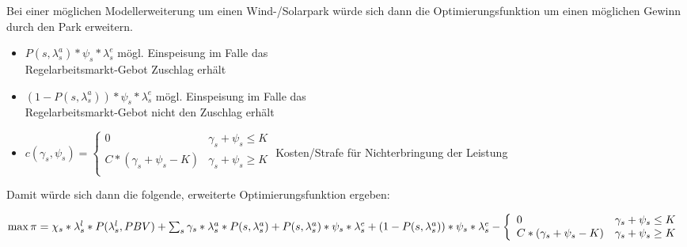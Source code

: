 \documentclass[british,         %
BCOR=2mm,                       %
11pt,                           %
a4paper,						%
oneside,						%
cdgeometry,                     %
toc=chapterentrydotfill,        %
toc=indent,                     %
bibliography=totoc,         	%
listof=totoc,                   %
numbers=noenddot,				%
parskip=full,                   %
cdmath=false					%
]{article}                  %
\begin{document}
Bei einer möglichen Modellerweiterung um einen Wind-/Solarpark würde sich dann die Optimierungsfunktion
um einen möglichen Gewinn durch den Park erweitern.\\


	\begin{itemize}
		\item $ P(s, \lambda_s^a) * \psi_s * \lambda_s^e$ mögl. Einspeisung im Falle das \\Regelarbeitsmarkt-Gebot Zuschlag erhält\\
		\item $ (1 - P(s, \lambda_s^a)) * \psi_s * \lambda_s^e$ mögl. Einspeisung im Falle das \\Regelarbeitsmarkt-Gebot nicht den Zuschlag erhält\\
		\item 	$c(\gamma_s, \psi_s) = \left\{
			\begin{array}{ll}
				0 & \gamma_s + \psi_s \leq K \\
				C * (\gamma_s + \psi_s - K) & \gamma_s + \psi_s \geq K \\
			\end{array}
		\right. $ Kosten/Strafe für Nichterbringung der Leistung\\

	\end{itemize}
	
	


Damit würde sich dann die folgende, erweiterte Optimierungsfunktion ergeben:\\
\begin{addmargin}[25pt]{0pt}
	$\max \pi = \chi_s * \lambda_s^l * P(\lambda_s^l, PBV) \\
	+ \sum_{s} \gamma_s * \lambda_s^a * P(s,\lambda_s^a)\\
	+P(s, \lambda_s^a) * \psi_s * \lambda_s^e\\
	+(1 - P(s, \lambda_s^a)) * \psi_s * \lambda_s^e\\
	- \left\{
		\begin{array}{ll}
			0 & \gamma_s + \psi_s \leq K \\
			C * (\gamma_s + \psi_s - K) & \gamma_s + \psi_s \geq K \\
		\end{array}
	\right. $
	\end{addmargin}
\end{document}

